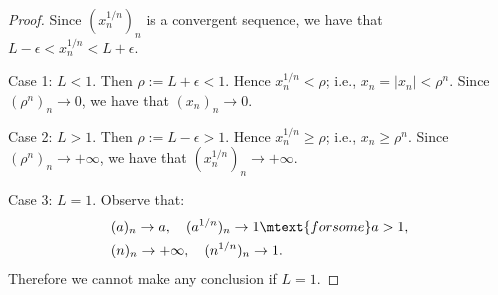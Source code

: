 \documentclass[10pt,twoside,openany]{memoir}
\begin{document}
            \begin{proof}
                Since $(x_n^{1/n})_n$ is a convergent sequence, we have that $L - \epsilon < x_n^{1/n} < L + \epsilon$.

                Case 1: $L < 1$. Then $\rho := L+\epsilon < 1$. Hence $x_n^{1/n} < \rho$; i.e., $x_n = |x_n| < \rho^n$. Since $(\rho^n)_n \rightarrow 0$, we have that $(x_n)_n \rightarrow 0$.

                Case 2: $L > 1$. Then $\rho := L - \epsilon >1$. Hence $x_n^{1/n} \geq \rho$; i.e., $x_n \geq \rho^n$. Since $(\rho^n)_n \rightarrow +\infty$, we have that $(x_n^{1/n})_n \rightarrow +\infty$.

                Case 3: $L = 1$. Observe that:
                    \begin{equation*}
                    \begin{split}
                        &(a)_n \rightarrow a, \hspace{10pt} (a^{1/n})_n \rightarrow 1 \mtext{for some} a > 1, \\
                        &(n)_n \rightarrow +\infty, \hspace{10pt} (n^{1/n})_n \rightarrow 1.
                    \end{split}
                    \end{equation*}
                Therefore we cannot make any conclusion if $L = 1$.
            \end{proof}
\end{document}
